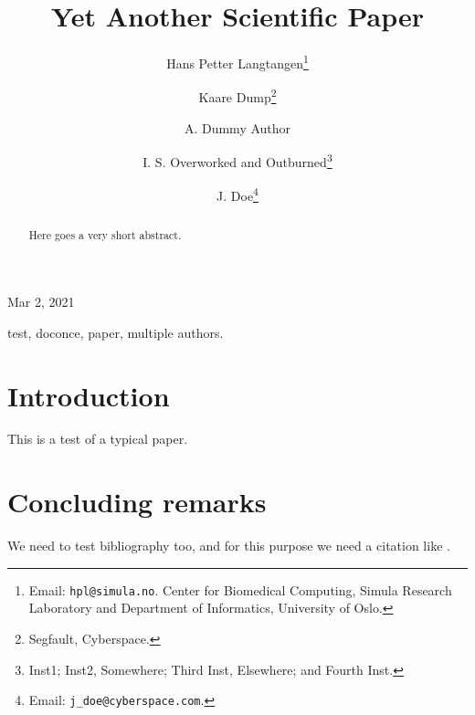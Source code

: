 \documentclass[leqno,final]{siamltex}
\begin{document}

\newcommand{\exercisesection}[1]{\subsection*{#1}}








\title{Yet Another Scientific Paper}


\author{Hans Petter Langtangen\thanks{Email: \texttt{hpl@simula.no}. Center for Biomedical Computing, Simula Research Laboratory and Department of Informatics, University of Oslo.}
\and Kaare Dump\thanks{Segfault, Cyberspace.}
\and A. Dummy Author
\and I. S. Overworked and Outburned\thanks{Inst1; Inst2, Somewhere; Third Inst, Elsewhere; and Fourth Inst.}
\and J. Doe\thanks{Email: \texttt{j\_doe@cyberspace.com}.}}


\begin{center}
Mar 2, 2021
\end{center}

\vspace{1cm}

\begin{abstract}
Here goes
a very short
abstract.
\end{abstract}


\begin{keywords}
test, doconce, paper, multiple authors.
\end{keywords}


\vspace{1cm} %

\section{Introduction}

This is a test of a typical paper.

\section{Concluding remarks}

We need to test bibliography too, and for this purpose we need
a citation like \cite{Langtangen_1992c,Langtangen_1994a}.





\end{document}

